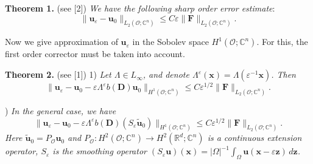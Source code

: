 \documentclass[10pt,a4paper]{article}
\begin{document}
\smallskip
\noindent\textbf{Theorem 1.} (see [2]) \textit{We have the following sharp order
error estimate}:
$$
\| \mathbf{u}_\varepsilon - \mathbf{u}_0 \|_{L_2(\mathcal{O};\mathbb{C}^n)}
\le C \varepsilon \| \mathbf{F}\|_{L_2(\mathcal{O};\mathbb{C}^n)}.
$$


Now we give approximation of $\mathbf{u}_\varepsilon$ in the Sobolev space
$H^1(\mathcal{O};\mathbb{C}^n)$. For this, the first order corrector must be taken into account.

\smallskip
\noindent\textbf{Theorem 2.} (see [1]) 1) \textit{Let $\Lambda \in L_\infty$, and denote
$\Lambda^\varepsilon(\mathbf{x}) = \Lambda(\varepsilon^{-1} \mathbf{x})$. Then}
$$
\| \mathbf{u}_\varepsilon - \mathbf{u}_0 - \varepsilon \Lambda^\varepsilon b(\mathbf{D})
\mathbf{u}_0 \|_{H^1(\mathcal{O};\mathbb{C}^n)}
\le C \varepsilon^{1/2} \| \mathbf{F}\|_{L_2(\mathcal{O};\mathbb{C}^n)}.
$$

) \textit{In the general case, we have}
$$
\| \mathbf{u}_\varepsilon - \mathbf{u}_0 - \varepsilon \Lambda^\varepsilon b(\mathbf{D})
(S_\varepsilon \widetilde{\mathbf{u}}_0) \|_{H^1(\mathcal{O};\mathbb{C}^n)}
\le C \varepsilon^{1/2} \| \mathbf{F}\|_{L_2(\mathcal{O};\mathbb{C}^n)}.
$$
\textit{Here $\widetilde{\mathbf{u}}_0 = P_{\mathcal{O}} \mathbf{u}_0$ and
$P_{\mathcal{O}}: H^2(\mathcal{O};\mathbb{C}^n) \to H^2(\mathbb{R}^d;\mathbb{C}^n)$
is a continuous extension operator, $S_\varepsilon$ is the smoothing operator
$(S_\varepsilon \mathbf{u})(\mathbf{x}) = |\Omega|^{-1} \int_\Omega
\mathbf{u}(\mathbf{x} - \varepsilon \mathbf{z})\,d\mathbf{z}$.}

\end{document}
